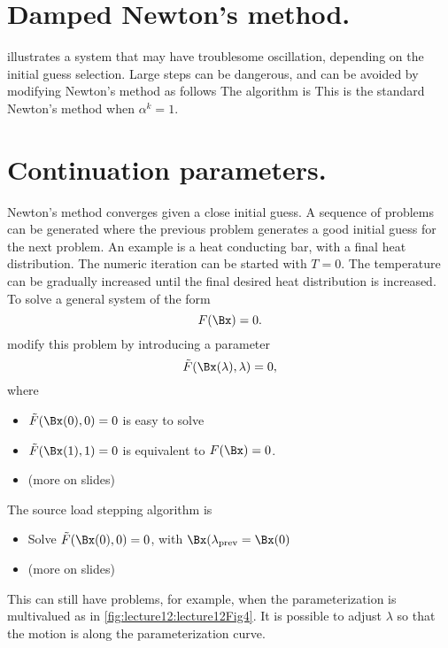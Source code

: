 %
%
%
\section{Damped Newton's method.}
%
 illustrates a system that may have troublesome oscillation, depending on the initial guess selection.
%
%
%
Large steps can be dangerous, and can be avoided by modifying Newton's method as follows
%
The algorithm is
%
This is the standard Newton's method when \( \alpha^k = 1 \).
%
\section{Continuation parameters.}
%
Newton's method converges given a close initial guess.  A sequence of problems can be generated where the previous problem generates a good initial guess for the next problem.
%
An example is a heat conducting bar, with a final heat distribution.  The numeric iteration can be started with \( T = 0 \).  The temperature can be gradually increased until the final desired heat distribution is increased.
%
To solve a general system of the form
%
\begin{equation}\label{eqn:multiphysicsL12:340}
F(\Bx) = 0.
\end{equation}
%
modify this problem by introducing a parameter
%
\begin{equation}\label{eqn:multiphysicsL12:360}
\tilde{F}(\Bx(\lambda), \lambda) = 0,
\end{equation}
%
where
%
\begin{itemize}
\item \( \tilde{F}(\Bx(0), 0) = 0 \) is easy to solve
\item \( \tilde{F}(\Bx(1), 1) = 0 \) is equivalent to \( F(\Bx) = 0 \).
\item (more on slides)
\end{itemize}
%
The source load stepping algorithm is
%
\begin{itemize}
\item Solve \(\tilde{F}(\Bx(0), 0) = 0 \), with \( \Bx(\lambda_{\text{prev}} = \Bx(0) \)
\item (more on slides)
\end{itemize}
%
This can still have problems, for example, when the parameterization is multivalued as in \cref{fig:lecture12:lecture12Fig4}.
%
%
It is possible to adjust \( \lambda \) so that the motion is along the parameterization curve.
%
